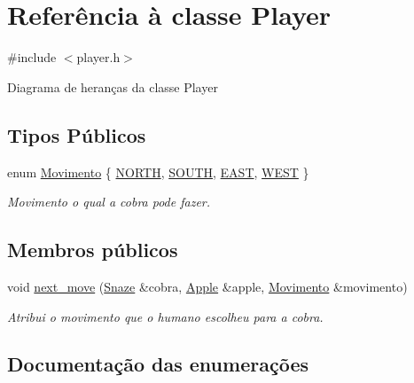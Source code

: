 \hypertarget{classPlayer}{}\section{Referência à classe Player}
\label{classPlayer}


{\ttfamily \#include $<$player.\+h$>$}



Diagrama de heranças da classe Player
\subsection*{Tipos Públicos}
\begin{DoxyCompactItemize}
\item 
enum \hyperlink{classPlayer_acbe38ac3cf005ce5b63f0bd4e8a12540}{Movimento} \{ \hyperlink{classPlayer_acbe38ac3cf005ce5b63f0bd4e8a12540ac425a85dbaf6c7179ac7eaf197be9836}{N\+O\+R\+TH}, 
\hyperlink{classPlayer_acbe38ac3cf005ce5b63f0bd4e8a12540ad5c325d71833b9f18c5ca206fd493c9d}{S\+O\+U\+TH}, 
\hyperlink{classPlayer_acbe38ac3cf005ce5b63f0bd4e8a12540ad2bc6fb170bdfa34f5c2d98913266f36}{E\+A\+ST}, 
\hyperlink{classPlayer_acbe38ac3cf005ce5b63f0bd4e8a12540ae41e6aa0c1dbf9513571b0dbacd43b6d}{W\+E\+ST}
 \}\begin{DoxyCompactList}\small\item\em Movimento o qual a cobra pode fazer. \end{DoxyCompactList}
\end{DoxyCompactItemize}
\subsection*{Membros públicos}
\begin{DoxyCompactItemize}
\item 
void \hyperlink{classPlayer_a35fe8a9a291d0d700882f7cc6620172c}{next\+\_\+move} (\hyperlink{classSnaze}{Snaze} \&cobra, \hyperlink{classApple}{Apple} \&apple, \hyperlink{classPlayer_acbe38ac3cf005ce5b63f0bd4e8a12540}{Movimento} \&movimento)
\begin{DoxyCompactList}\small\item\em Atribui o movimento que o humano escolheu para a cobra. \end{DoxyCompactList}\end{DoxyCompactItemize}


\subsection{Documentação das enumerações}
\mbox{\label{classPlayer_acbe38ac3cf005ce5b63f0bd4e8a12540}} 

